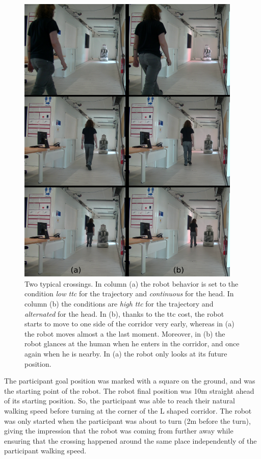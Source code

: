 \documentclass[a4paper,11pt,twoside]{StyleThese}
\begin{document}
\begin{figure}[hbtp]
\centering
\includegraphics[width=0.95\textwidth]{figures/chapter2/Chap2ExpeReal.png}
\caption{Two typical crossings. In column (a) the robot behavior is set to the condition \textit{low \acrshort{ttc}} for the trajectory and \textit{continuous} for the head. In column (b) the conditions are \textit{high \acrshort{ttc}} for the trajectory and \textit{alternated} for the head. In (b), thanks to the \acrshort{ttc} cost, the robot starts to move to one side of the corridor very early, whereas in (a) the robot moves almost a the last moment. Moreover, in (b) the robot glances at the human when he enters in the corridor, and once again when he is nearby. In (a) the robot only looks at its future position.}
\label{fig:realttc}
\end{figure}

The participant goal position was marked with a square on the ground, and was the starting point of the robot. The robot final position was 10m straight ahead of its starting position. So, the participant was able to reach their natural walking speed before turning at the corner of the L shaped corridor. The robot was only started when the participant was about to turn (2m before the turn), giving the impression that the robot was coming from further away while ensuring that the crossing happened around the same place independently of the participant walking speed.
\end{document}
